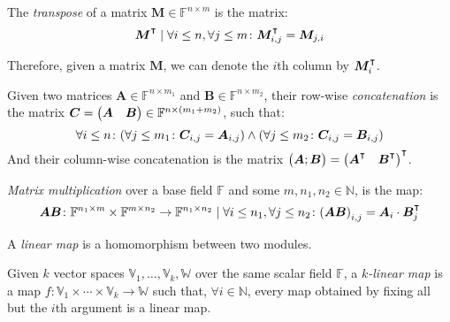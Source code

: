 \begin{definition}
  The \emph{transpose} of a matrix \(\bm{M} \in \mathbb{F}^{n \times m}\) is the matrix:
  \[\bm{M}^{\transpose} \mid 
  \forall i \le n, \forall j \le m\colon \bm{M}^{\transpose}_{i,j} = \bm{M}_{j,i}\]
\end{definition}

Therefore, given a matrix \(\bm{M}\), we can denote the \(i\)th column by 
\(\bm{M}^{\transpose}_{i}\).

\begin{definition}
  Given two matrices \(\bm{A} \in \mathbb{F}^{n \times m_1}\) and 
  \(\bm{B} \in \mathbb{F}^{n \times m_2}\), their row-wise \emph{concatenation} is the matrix 
  \(\bm{C} = 
  \begin{pmatrix*}
    \bm{A} & \bm{B}
  \end{pmatrix*}
    \in \mathbb{F}^{n \times \Parens*{m_1 + m_2}}\), such that:
  \[\forall i \le n\colon \Parens*{\forall j \le m_1 \colon \bm{C}_{i,j} = \bm{A}_{i,j}} \wedge 
  \Parens*{\forall j \le m_2\colon \bm{C}_{i,j} = \bm{B}_{i,j}}\]
  And their column-wise concatenation is the matrix \(
  \begin{pmatrix*}
    \bm{A}; \bm{B}
  \end{pmatrix*} =
  {\begin{pmatrix*}
    \bm{A}^{\transpose} & \bm{B}^{\transpose}
  \end{pmatrix*}}^{\transpose}
  \).
\end{definition}

\begin{definition}
  \emph{Matrix multiplication} over a base field \(\mathbb{F}\) and some 
  \(m, n_1, n_2 \in \mathbb{N}\), is the map:
  \[
    \bm{A}\bm{B}\colon 
    \mathbb{F}^{n_1 \times m} \times \mathbb{F}^{m \times n_2} \to \mathbb{F}^{n_1 \times n_2} \mid 
    \forall i \le n_1, \forall j \le n_2\colon 
    \Parens*{\bm{A}\bm{B}}_{i,j} = \bm{A}_{i} \cdot \bm{B}^{\transpose}_{j}
  \] 
\end{definition}

\begin{definition}
   A \emph{linear map} is a homomorphism between two modules.
\end{definition}
\begin{definition}
  Given \(k\) vector spaces \(\mathbb{V}_1, \dots, \mathbb{V}_k, \mathbb{W}\) over the same scalar 
  field \(\mathbb{F}\), a \emph{\(k\)-linear map} is a map
  \(f\colon \mathbb{V}_1 \times \cdots \times \mathbb{V}_k \to \mathbb{W}\) 
  such that, \(\forall i \in \mathbb{N}\), every map obtained by fixing all but the 
  \(i\)th argument is a linear map.
\end{definition}

